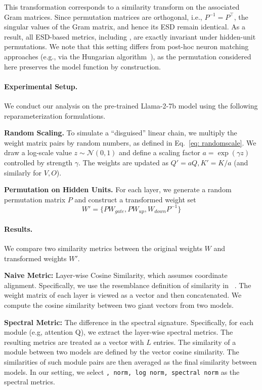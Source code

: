 This transformation corresponds to a similarity transform on the associated Gram matrices. Since permutation matrices are orthogonal, i.e., $P^{-1} = P^\top$, the singular values of the Gram matrix, and hence its ESD remain identical.
As a result, all ESD-based metrics, including \ALPHAHILL, are exactly invariant under hidden-unit permutations.
We note that this setting differs from post-hoc neuron matching approaches (e.g., via the Hungarian algorithm~\cite{zhu2025independence}), as the permutation considered here preserves the model function by construction.



\paragraph{Experimental Setup.}
We conduct our analysis on the pre-trained Llama-2-7b model using the following reparameterization formulations.

\textbf{Random Scaling.} To simulate a ``disguised'' linear chain, we multiply the weight matrix pairs by random numbers, as defined in Eq.~\ref{eq: randomscale}. We draw a log-scale value $z \sim \mathcal{N}(0, 1)$ and define a scaling factor $a = \exp(\gamma z)$ controlled by strength $\gamma$. The weights are updated as $Q' = a Q, K' = K/a$ (and similarly for $V, O$).

\textbf{Permutation on Hidden Units.}
For each layer, we generate a random permutation matrix $P$ and construct a transformed weight set 
\[
W' = \{P W_{gate}, P W_{up}, W_{down} P^{-1}\}
\]



\paragraph{Results.}
We compare two similarity metrics between the original weights $W$ and transformed weights $W'$.

\textbf{Naive Metric:} Layer-wise Cosine Similarity, which assumes coordinate alignment. Specifically, we use the resemblance definition of similarity in ~\cite{zeng2024HuRef}. The weight matrix of each layer is viewed as a vector and then concatenated. We compute the cosine similarity between two giant vectors from two models.

\textbf{Spectral Metric:} The difference in the spectral signature. Specifically, for each module (e.g, attention Q), we extract the layer-wise spectral metrics. The resulting metrics are treated as a vector with $L$ entries. The similarity of a module between two models are defined by the vector cosine similarity. The similarities of such module pairs are then averaged as the final similarity between models. In our setting, we select \texttt{\ALPHAHILL, norm, log norm, spectral norm} as the spectral metrics.

